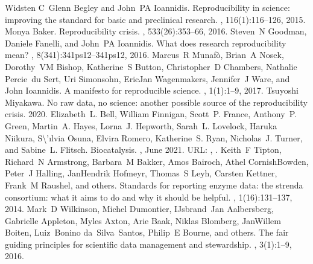 \documentclass[letterpaper,12pt,english]{jupyterBook}
\begin{document}
\sphinxstepscope

\begin{sphinxthebibliography}{Widsten }
\sphinxAtStartPar
C Glenn Begley and John PA Ioannidis. Reproducibility in science: improving the standard for basic and preclinical research. , 116(1):116–126, 2015.
\sphinxAtStartPar
Monya Baker. Reproducibility crisis. , 533(26):353–66, 2016.
\sphinxAtStartPar
Steven N Goodman, Daniele Fanelli, and John PA Ioannidis. What does research reproducibility mean? , 8(341):341ps12–341ps12, 2016.
\sphinxAtStartPar
Marcus R Munafò, Brian A Nosek, Dorothy VM Bishop, Katherine S Button, Christopher D Chambers, Nathalie Percie du Sert, Uri Simonsohn, Eric\sphinxhyphen{}Jan Wagenmakers, Jennifer J Ware, and John Ioannidis. A manifesto for reproducible science. , 1(1):1–9, 2017.
\sphinxAtStartPar
Tsuyoshi Miyakawa. No raw data, no science: another possible source of the reproducibility crisis. 2020.
\sphinxAtStartPar
Elizabeth L. Bell, William Finnigan, Scott P. France, Anthony P. Green, Martin A. Hayes, Lorna J. Hepworth, Sarah L. Lovelock, Haruka Niikura, S\textbackslash{}'ılvia Osuna, Elvira Romero, Katherine S. Ryan, Nicholas J. Turner, and Sabine L. Flitsch. Biocatalysis. , June 2021. URL: , .
\sphinxAtStartPar
Keith F Tipton, Richard N Armstrong, Barbara M Bakker, Amos Bairoch, Athel Cornish\sphinxhyphen{}Bowden, Peter J Halling, Jan\sphinxhyphen{}Hendrik Hofmeyr, Thomas S Leyh, Carsten Kettner, Frank M Raushel, and others. Standards for reporting enzyme data: the strenda consortium: what it aims to do and why it should be helpful. , 1(1\sphinxhyphen{}6):131–137, 2014.
\sphinxAtStartPar
Mark D Wilkinson, Michel Dumontier, IJsbrand Jan Aalbersberg, Gabrielle Appleton, Myles Axton, Arie Baak, Niklas Blomberg, Jan\sphinxhyphen{}Willem Boiten, Luiz Bonino da Silva Santos, Philip E Bourne, and others. The fair guiding principles for scientific data management and stewardship. , 3(1):1–9, 2016.

\end{sphinxthebibliography}
\end{document}
